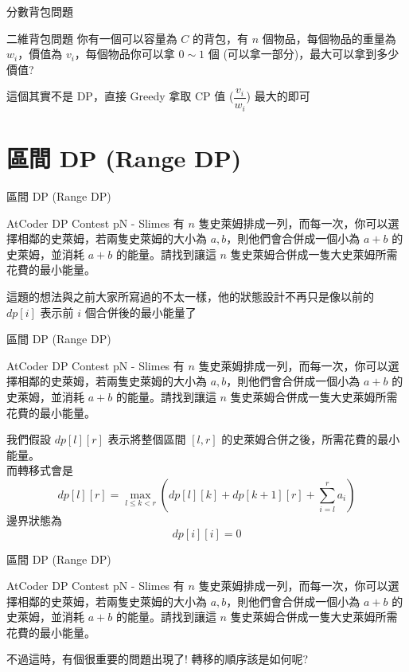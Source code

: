 \documentclass[aspectratio=169]{beamer}
\begin{document}
\begin{frame}[fragile]{分數背包問題}
    \begin{block}{二維背包問題}
        你有一個可以容量為 $C$ 的背包，有 $n$ 個物品，每個物品的重量為 $w_i$，價值為 $v_i$，每個物品你可以拿 $0 \sim 1$ 個 (可以拿一部分)，最大可以拿到多少價值?
    \end{block} \pause
    這個其實不是 DP，直接 Greedy 拿取 CP 值 ($\dfrac{v_i}{w_i}$) 最大的即可 
\end{frame} 

\section{區間 DP (Range DP)}

\begin{frame}{區間 DP (Range DP)}
    \begin{block}{AtCoder DP Contest pN - Slimes}
        有 $n$ 隻史萊姆排成一列，而每一次，你可以選擇相鄰的史萊姆，若兩隻史萊姆的大小為 $a,b$，則他們會合併成一個小為 $a+b$ 的史萊姆，並消耗 $a+b$ 的能量。請找到讓這 $n$ 隻史萊姆合併成一隻大史萊姆所需花費的最小能量。
    \end{block} \pause
    這題的想法與之前大家所寫過的不太一樣，他的狀態設計不再只是像以前的 $dp[i]$ 表示前 $i$ 個合併後的最小能量了
\end{frame}

\begin{frame}{區間 DP (Range DP)}
    \begin{block}{AtCoder DP Contest pN - Slimes}
        有 $n$ 隻史萊姆排成一列，而每一次，你可以選擇相鄰的史萊姆，若兩隻史萊姆的大小為 $a,b$，則他們會合併成一個小為 $a+b$ 的史萊姆，並消耗 $a+b$ 的能量。請找到讓這 $n$ 隻史萊姆合併成一隻大史萊姆所需花費的最小能量。
    \end{block} 
    我們假設 $dp[l][r]$ 表示將整個區間 $[l,r]$ 的史萊姆合併之後，所需花費的最小能量。 \pause \\
    而轉移式會是
    $$dp[l][r] = \max_{l \le k < r}(dp[l][k] + dp[k+1][r] + \sum_{i=l}^r a_i)$$
    邊界狀態為 
    $$dp[i][i] = 0$$
\end{frame}

\begin{frame}{區間 DP (Range DP)}
    \begin{block}{AtCoder DP Contest pN - Slimes}
        有 $n$ 隻史萊姆排成一列，而每一次，你可以選擇相鄰的史萊姆，若兩隻史萊姆的大小為 $a,b$，則他們會合併成一個小為 $a+b$ 的史萊姆，並消耗 $a+b$ 的能量。請找到讓這 $n$ 隻史萊姆合併成一隻大史萊姆所需花費的最小能量。
    \end{block} 
    不過這時，有個很重要的問題出現了! 轉移的順序該是如何呢?
\end{frame}
\end{document}
